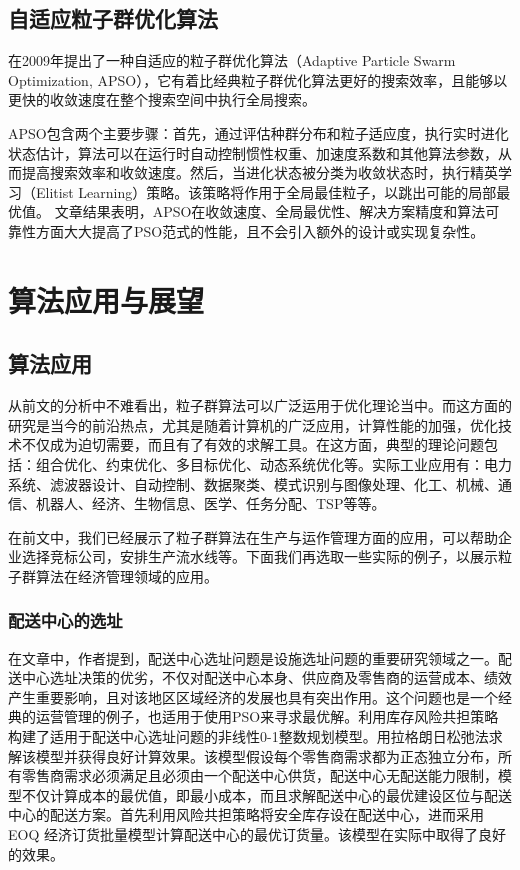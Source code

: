 \documentclass[lang=cn,12pt,a4paper,cite=authoryear]{elegantpaper}
\begin{document}
\subsection{自适应粒子群优化算法}

\cite{zhan2009adaptive}在2009年提出了一种自适应的粒子群优化算法（Adaptive Particle Swarm Optimization, APSO），它有着比经典粒子群优化算法更好的搜索效率，且能够以更快的收敛速度在整个搜索空间中执行全局搜索。 

APSO包含两个主要步骤：首先，通过评估种群分布和粒子适应度，执行实时进化状态估计，算法可以在运行时自动控制惯性权重、加速度系数和其他算法参数，从而提高搜索效率和收敛速度。然后，当进化状态被分类为收敛状态时，执行精英学习（Elitist Learning）策略。该策略将作用于全局最佳粒子，以跳出可能的局部最优值。 文章结果表明，APSO在收敛速度、全局最优性、解决方案精度和算法可靠性方面大大提高了PSO范式的性能，且不会引入额外的设计或实现复杂性。



\section{算法应用与展望}

\subsection{算法应用}

从前文的分析中不难看出，粒子群算法可以广泛运用于优化理论当中。而这方面的研究是当今的前沿热点，尤其是随着计算机的广泛应用，计算性能的加强，优化技术不仅成为迫切需要，而且有了有效的求解工具。在这方面，典型的理论问题包括：组合优化、约束优化、多目标优化、动态系统优化等。实际工业应用有：电力系统、滤波器设计、自动控制、数据聚类、模式识别与图像处理、化工、机械、通信、机器人、经济、生物信息、医学、任务分配、TSP等等。

在前文中，我们已经展示了粒子群算法在生产与运作管理方面的应用，可以帮助企业选择竞标公司，安排生产流水线等。下面我们再选取一些实际的例子，以展示粒子群算法在经济管理领域的应用。

\subsubsection{配送中心的选址}

在文章\citep{TN_wanfang_jourgljtkj201112026}中，作者提到，配送中心选址问题是设施选址问题的重要研究领域之一。配送中心选址决策的优劣，不仅对配送中心本身、供应商及零售商的运营成本、绩效产生重要影响，且对该地区区域经济的发展也具有突出作用。这个问题也是一个经典的运营管理的例子，也适用于使用PSO来寻求最优解。\cite{TN_springer_jour1020763400324}利用库存风险共担策略构建了适用于配送中心选址问题的非线性0-1整数规划模型。\cite{TN_informstrsc.37.1.40.12823}用拉格朗日松弛法求解该模型并获得良好计算效果。该模型假设每个零售商需求都为正态独立分布，所有零售商需求必须满足且必须由一个配送中心供货，配送中心无配送能力限制，模型不仅计算成本的最优值，即最小成本，而且求解配送中心的最优建设区位与配送中心的配送方案。\cite{TN_informstrsc.37.1.40.12823}首先利用风险共担策略将安全库存设在配送中心，进而采用EOQ 经济订货批量模型计算配送中心的最优订货量。该模型在实际中取得了良好的效果。
\end{document}
